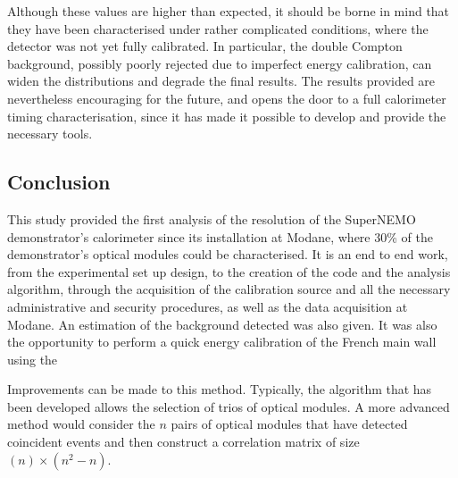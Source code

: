 Although these values are higher than expected, it should be borne in mind that they have been characterised under rather complicated conditions, where the detector was not yet fully calibrated.
In particular, the double Compton background, possibly poorly rejected due to imperfect energy calibration, can widen the distributions and degrade the final results.
The results provided are nevertheless encouraging for the future, and opens the door to a full calorimeter timing characterisation, since it has made it possible to develop and provide the necessary tools.


\subsection{Conclusion}


This study provided the first analysis of the resolution of the SuperNEMO demonstrator's calorimeter since its installation at Modane, where $30$\% of the demonstrator's optical modules could be characterised.
It is an end to end work, from the experimental set up design, to the creation of the code and the analysis algorithm, through the acquisition of the calibration source and all the necessary administrative and security procedures, as well as the data acquisition at Modane.
An estimation of the background detected was also given.
It was also the opportunity to perform a quick energy calibration of the French main wall using the %

Improvements can be made to this method.
Typically, the algorithm that has been developed allows the selection of trios of optical modules.
A more advanced method would consider the $n$ pairs of optical modules that have detected coincident events and then construct a correlation matrix of size $(n)\times(n^{2}-n)$.




